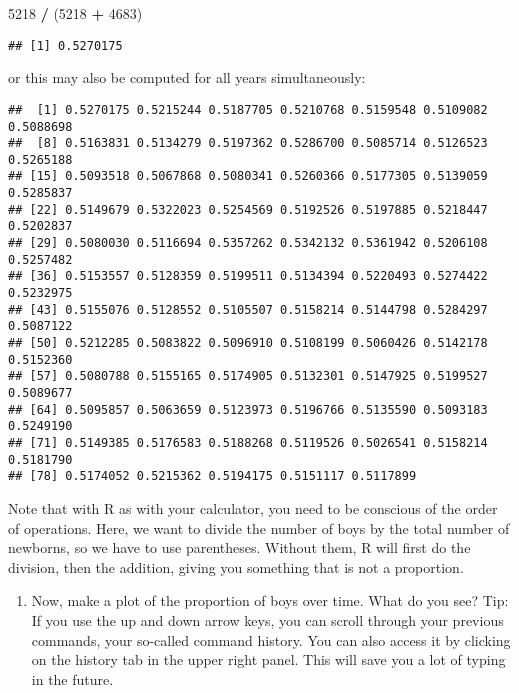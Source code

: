 \documentclass[
]{article}
\newenvironment{Shaded}{\begin{snugshade}}{\end{snugshade}}
\newcommand{\DecValTok}[1]{\textcolor[rgb]{0.00,0.00,0.81}{#1}}
\newcommand{\NormalTok}[1]{#1}
\newcommand{\OperatorTok}[1]{\textcolor[rgb]{0.81,0.36,0.00}{\textbf{#1}}}
\newcommand{\StringTok}[1]{\textcolor[rgb]{0.31,0.60,0.02}{#1}}
\providecommand{\tightlist}{%
  \setlength{\itemsep}{0pt}\setlength{\parskip}{0pt}}
\begin{document}
\begin{Shaded}
\begin{Highlighting}[]
\DecValTok{5218} \OperatorTok{/}\StringTok{ }\NormalTok{(}\DecValTok{5218} \OperatorTok{+}\StringTok{ }\DecValTok{4683}\NormalTok{)}
\end{Highlighting}
\end{Shaded}

\begin{verbatim}
## [1] 0.5270175
\end{verbatim}

or this may also be computed for all years simultaneously:

\begin{Shaded}
\end{Shaded}

\begin{verbatim}
##  [1] 0.5270175 0.5215244 0.5187705 0.5210768 0.5159548 0.5109082 0.5088698
##  [8] 0.5163831 0.5134279 0.5197362 0.5286700 0.5085714 0.5126523 0.5265188
## [15] 0.5093518 0.5067868 0.5080341 0.5260366 0.5177305 0.5139059 0.5285837
## [22] 0.5149679 0.5322023 0.5254569 0.5192526 0.5197885 0.5218447 0.5202837
## [29] 0.5080030 0.5116694 0.5357262 0.5342132 0.5361942 0.5206108 0.5257482
## [36] 0.5153557 0.5128359 0.5199511 0.5134394 0.5220493 0.5274422 0.5232975
## [43] 0.5155076 0.5128552 0.5105507 0.5158214 0.5144798 0.5284297 0.5087122
## [50] 0.5212285 0.5083822 0.5096910 0.5108199 0.5060426 0.5142178 0.5152360
## [57] 0.5080788 0.5155165 0.5174905 0.5132301 0.5147925 0.5199527 0.5089677
## [64] 0.5095857 0.5063659 0.5123973 0.5196766 0.5135590 0.5093183 0.5249190
## [71] 0.5149385 0.5176583 0.5188268 0.5119526 0.5026541 0.5158214 0.5181790
## [78] 0.5174052 0.5215362 0.5194175 0.5151117 0.5117899
\end{verbatim}

Note that with R as with your calculator, you need to be conscious of
the order of operations. Here, we want to divide the number of boys by
the total number of newborns, so we have to use parentheses. Without
them, R will first do the division, then the addition, giving you
something that is not a proportion.

\begin{enumerate}
\def\labelenumi{\arabic{enumi}.}
\setcounter{enumi}{2}
\tightlist
\item
  Now, make a plot of the proportion of boys over time. What do you see?
  Tip: If you use the up and down arrow keys, you can scroll through
  your previous commands, your so-called command history. You can also
  access it by clicking on the history tab in the upper right panel.
  This will save you a lot of typing in the future.
\end{enumerate}
\end{document}

